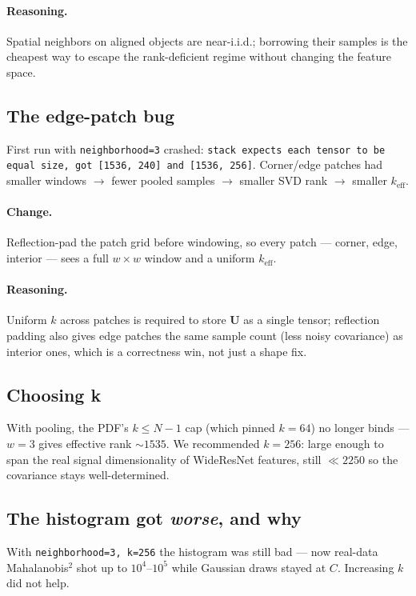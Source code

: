 \documentclass[11pt]{article}
\newcommand{\code}[1]{\texttt{#1}}
\begin{document}
\paragraph{Reasoning.}
Spatial neighbors on aligned objects are near-i.i.d.; borrowing their samples is
the cheapest way to escape the rank-deficient regime without changing the feature
space.

\subsection{The edge-patch bug}

First run with \code{neighborhood=3} crashed:
\code{stack expects each tensor to be equal size, got [1536, 240] and [1536, 256]}.
Corner/edge patches had smaller windows $\to$ fewer pooled samples $\to$ smaller
SVD rank $\to$ smaller $k_{\text{eff}}$.

\paragraph{Change.}
Reflection-pad the patch grid before windowing, so every patch --- corner, edge,
interior --- sees a full $w \times w$ window and a uniform $k_{\text{eff}}$.

\paragraph{Reasoning.}
Uniform $k$ across patches is required to store $\mathbf{U}$ as a single tensor;
reflection padding also gives edge patches the same sample count (less noisy
covariance) as interior ones, which is a correctness win, not just a shape fix.

\subsection{Choosing k}

With pooling, the PDF's $k \le N-1$ cap (which pinned $k = 64$) no longer binds
--- $w = 3$ gives effective rank ${\sim}1535$. We recommended $k = 256$: large
enough to span the real signal dimensionality of WideResNet features, still
$\ll 2250$ so the covariance stays well-determined.

\subsection{The histogram got \emph{worse}, and why}

With \code{neighborhood=3, k=256} the histogram was still bad --- now real-data
Mahalanobis$^2$ shot up to $10^4$--$10^5$ while Gaussian draws stayed at $C$.
Increasing $k$ did not help.
\end{document}

